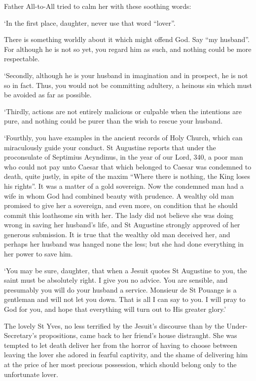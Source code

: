 \documentclass{article}
\begin{document}
\begin{center}
Father All-to-All tried to calm her with these soothing words: 

`In the first place, daughter, never use that word ``lover''. 

There is something worldly about it which might offend God. Say ``my husband''. 
For although he is not so yet, you regard him as such, and nothing could be more 
respectable. 

`Secondly, although he is your husband in imagination and in prospect, he is not 
so in fact. Thus, you would not be committing adultery, a heinous sin which must 
be avoided as far as possible. 

`Thirdly, actions are not entirely malicious or culpable when the intentions are 
pure, and nothing could be purer than the wish to rescue your husband. 

`Fourthly, you have examples in the ancient records of Holy Church, which can miraculously 
guide your conduct. St Augustine reports that under the proconsulate of Septimius 
Acyndinus, in the year of our Lord, 340, a poor man who could not pay unto Caesar 
that which belonged to Caesar was condemned to death, quite justly, in spite of 
the maxim ``Where there is nothing, the King loses his rights''. It was a matter 
of a gold sovereign. Now the condemned man had a wife in whom God had combined 
beauty with prudence. A wealthy old man promised to give her a sovereign, and even 
more, on condition that he should commit this loathsome sin with her. The lady 
did not believe she was doing wrong in saving her husband's life, and St Augustine 
strongly approved of her generous submission. It is true that the wealthy old man 
deceived her, and perhaps her husband was hanged none the less; but she had done 
everything in her power to save him. 

`You may be sure, daughter, that when a Jesuit quotes St Augustine to you, the 
saint must be absolutely right. I give you no advice. You are sensible, and presumably 
you will do your husband a service. Monsieur de St Pouange is a gentleman and will 
not let you down. That is all I can say to you. I will pray to God for you, and 
hope that everything will turn out to His greater glory.' 

The lovely St Yves, no less terrified by the Jesuit's discourse than by the Under-Secretary's 
propositions, came back to her friend's house distraught. She was tempted to let 
death deliver her from the horror of having to choose between leaving the lover 
she adored in fearful captivity, and the shame of delivering him at the price of 
her most precious possession, which should belong only to the unfortunate lover.\pagebreak{} 


\end{center}
\end{document}
